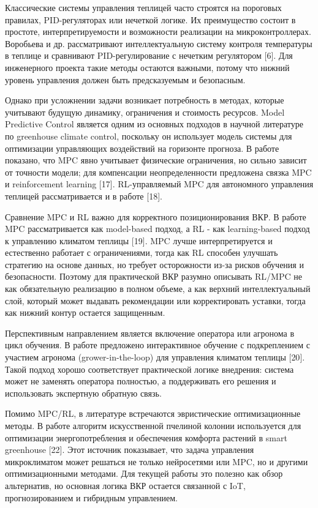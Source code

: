 \documentclass[a4paper,14pt]{extarticle}
\begin{document}
Классические системы управления теплицей часто строятся на пороговых
правилах, PID-регуляторах или нечеткой логике. Их преимущество состоит в
простоте, интерпретируемости и возможности реализации на
микроконтроллерах. Воробьева и др. рассматривают интеллектуальную
систему контроля температуры в теплице и сравнивают PID-регулирование с
нечетким регулятором {[}6{]}. Для инженерного проекта такие методы
остаются важными, потому что нижний уровень управления должен быть
предсказуемым и безопасным.

Однако при усложнении задачи возникает потребность в методах, которые
учитывают будущую динамику, ограничения и стоимость ресурсов. Model
Predictive Control является одним из основных подходов в научной
литературе по greenhouse climate control, поскольку он использует модель
системы для оптимизации управляющих воздействий на горизонте прогноза. В
работе показано, что MPC явно учитывает физические ограничения, но
сильно зависит от точности модели; для компенсации неопределенности
предложена связка MPC и reinforcement learning {[}17{]}. RL-управляемый
MPC для автономного управления теплицей рассматривается и в работе
{[}18{]}.

Сравнение MPC и RL важно для корректного позиционирования ВКР. В работе
MPC рассматривается как model-based подход, а RL - как learning-based
подход к управлению климатом теплицы {[}19{]}. MPC лучше
интерпретируется и естественно работает с ограничениями, тогда как RL
способен улучшать стратегию на основе данных, но требует осторожности
из-за рисков обучения и безопасности. Поэтому для практической ВКР
разумно описывать RL/MPC не как обязательную реализацию в полном объеме,
а как верхний интеллектуальный слой, который может выдавать рекомендации
или корректировать уставки, тогда как нижний контур остается защищенным.

Перспективным направлением является включение оператора или агронома в
цикл обучения. В работе предложено интерактивное обучение с
подкреплением с участием агронома (grower-in-the-loop) для управления
климатом теплицы {[}20{]}. Такой подход хорошо соответствует
практической логике внедрения: система может не заменять оператора
полностью, а поддерживать его решения и использовать экспертную обратную
связь.

Помимо MPC/RL, в литературе встречаются эвристические оптимизационные
методы. В работе алгоритм искусственной пчелиной колонии используется
для оптимизации энергопотребления и обеспечения комфорта растений в
smart greenhouse {[}22{]}. Этот источник показывает, что задача
управления микроклиматом может решаться не только нейросетями или MPC,
но и другими оптимизационными методами. Для текущей работы это полезно
как обзор альтернатив, но основная логика ВКР остается связанной с IoT,
прогнозированием и гибридным управлением.
\end{document}
